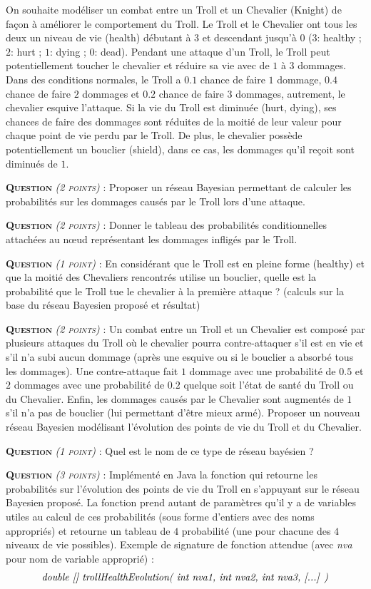 \documentclass[a4paper, 10pt]{article}
\newcounter{QQ}
\newcommand{\question}[1]{ \medskip \sffamily \textsc{\textbf{\large Question \stepcounter{QQ} \arabic{QQ}} \emph{\small(#1)}} : }
\begin{document}
  On souhaite modéliser un combat entre un Troll et un Chevalier (Knight) de façon à améliorer le comportement du Troll.
  Le Troll et le Chevalier ont tous les deux un niveau de vie (health) débutant à $3$ et descendant jusqu'à $0$ ($3$: healthy ; $2$: hurt ; $1$: dying ; $0$: dead).
  Pendant une attaque d'un Troll, le Troll peut potentiellement toucher le chevalier et réduire sa vie avec de $1$ à $3$ dommages.
  Dans des conditions normales, le Troll a $0.1$ chance de faire $1$ dommage, $0.4$ chance de faire $2$ dommages et  $0.2$ chance de faire $3$ dommages, autrement, le chevalier esquive l'attaque.
  Si la vie du Troll est diminuée (hurt, dying), ses chances de faire des dommages sont réduites de la moitié de leur valeur pour chaque point de vie perdu par le Troll.
  De plus, le chevalier possède potentiellement un bouclier (shield), dans ce cas, les dommages qu'il reçoit sont diminués de $1$.

\question{2 points}
  Proposer un réseau Bayesian permettant de calculer les probabilités sur les dommages causés par le Troll lors d'une attaque.
  
\question{2 points}
  Donner le tableau des probabilités conditionnelles attachées au n\oe{}ud représentant les dommages infligés par le Troll.

\question{1 point}
  En considérant que le Troll est en pleine forme (healthy) et que la moitié des Chevaliers rencontrés utilise un bouclier, quelle est la probabilité que le Troll tue le chevalier à la première attaque ? (calculs sur la base du réseau Bayesien proposé et résultat)
  
\question{2 points}
  Un combat entre un Troll et un Chevalier est composé par plusieurs attaques du Troll où le chevalier pourra contre-attaquer s'il est en vie et s'il n'a subi aucun dommage (après une esquive ou si le bouclier a absorbé tous les dommages).
  Une contre-attaque fait $1$ dommage avec une probabilité de $0.5$ et $2$ dommages avec une probabilité de $0.2$ quelque soit l'état de santé du Troll ou du Chevalier.
  Enfin, les dommages causés par le Chevalier sont augmentés de $1$ s'il n'a pas de bouclier (lui permettant d'être mieux armé).
  Proposer un nouveau réseau Bayesien modélisant l'évolution des points de vie du Troll et du Chevalier.

\question{1 point} Quel est le nom de ce type de réseau bayésien ?

\question{3 points}
  Implémenté en Java la fonction qui retourne les probabilités sur l'évolution des points de vie du Troll en s'appuyant sur le réseau Bayesien proposé.
  La fonction prend autant de paramètres qu'il y a de variables utiles au calcul de ces probabilités (sous forme d'entiers avec des noms appropriés) et retourne un tableau de $4$ probabilité (une pour chacune des $4$ niveaux de vie possibles).
  Exemple de signature de fonction attendue (avec \emph{nva} pour nom de variable approprié) : 
  $$ \text{\emph{ double [] trollHealthEvolution( int nva1,  int nva2,  int nva3, [...] ) }} $$
\end{document}
